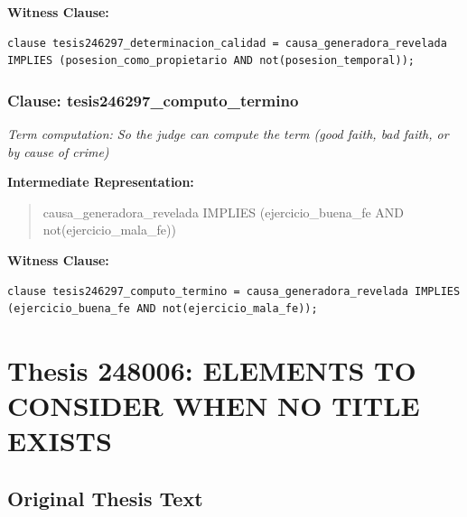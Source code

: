 \documentclass[11pt,a4paper]{article}
\begin{document}
\textbf{Witness Clause:}

\begin{lstlisting}[style=witnessstyle, language=Witness]
clause tesis246297_determinacion_calidad = causa_generadora_revelada IMPLIES (posesion_como_propietario AND not(posesion_temporal));
\end{lstlisting}

\subsubsection{Clause: tesis246297\_computo\_termino}

\textit{Term computation: So the judge can compute the term (good faith, bad faith, or by cause of crime)}

\textbf{Intermediate Representation:}

\begin{quote}
causa\_generadora\_revelada IMPLIES (ejercicio\_buena\_fe AND not(ejercicio\_mala\_fe))
\end{quote}

\textbf{Witness Clause:}

\begin{lstlisting}[style=witnessstyle, language=Witness]
clause tesis246297_computo_termino = causa_generadora_revelada IMPLIES (ejercicio_buena_fe AND not(ejercicio_mala_fe));
\end{lstlisting}

\newpage

\section{Thesis 248006: ELEMENTS TO CONSIDER WHEN NO TITLE EXISTS}
\label{thesis:248006}

\subsection{Original Thesis Text}
\end{document}
